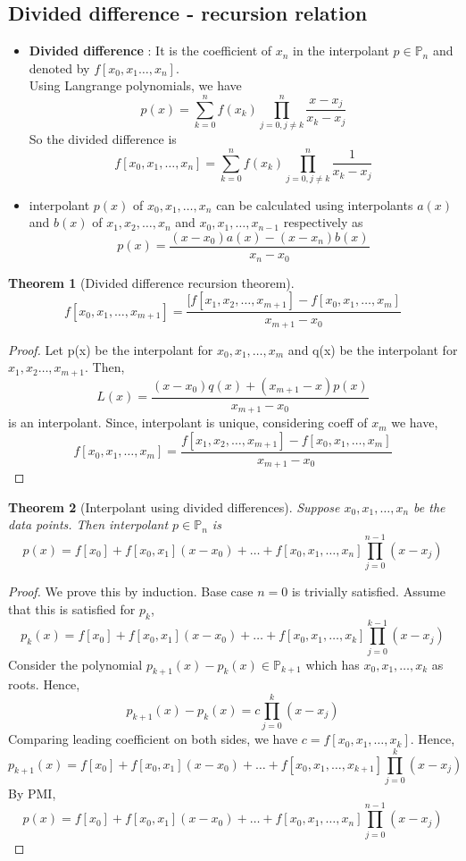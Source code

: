 \documentclass{article}
\newtheorem*{theorem}{Theorem}
\begin{document}
\subsection{Divided difference - recursion relation}
	\begin{itemize}
		\item \textbf{Divided difference} : It is the coefficient of $x_n$ in the interpolant $p \in \mathbb{P}_n$ and denoted by $f[x_0,x_1\hdots,x_n]$.\\
		Using Langrange polynomials, we have
		\[p(x)=\sum_{k=0}^n f(x_k) \prod_{j=0, j\neq k}^n \frac{x-x_j}{x_k-x_j}\]
		So the divided difference is
		\[f[x_0,x_1,\hdots,x_n]=\sum_{k=0}^n f(x_k) \prod_{j=0, j\neq k}^n \frac{1}{x_k-x_j}\]

		\item interpolant $p(x)$ of  $x_0,x_1,\hdots,x_n$ can be calculated using interpolants $a(x)$ and $b(x)$ of $x_1,x_2,\hdots,x_n$ and $x_0,x_1,\hdots,x_{n-1}$ respectively as 
			\[p(x)=\frac{(x-x_0)a(x)-(x-x_n)b(x)}{x_n-x_0}\]
	\end{itemize}

	\begin{theorem}[Divided difference recursion theorem]
		\[f[x_0,x_1,\hdots,x_{m+1}] = \frac{[f[x_1, x_2,\hdots,x_{m+1}] - f[x_0,x_1,\hdots,x_{m}]}{x_{m+1}-x_0}\]
	\end{theorem}
	\begin{proof}
		Let p(x) be the interpolant for $x_0,x_1,\hdots,x_m$ and q(x) be the interpolant for $x_1,x_2\hdots,x_{m+1}$. Then,
		\[L(x)= \frac{(x-x_0)q(x)+(x_{m+1}-x)p(x)}{x_{m+1}-x_0}\] is an interpolant.
		Since, interpolant is unique, considering coeff of $x_{m}$ we have,
		\[f[x_0,x_1,\hdots, x_m]=  \frac{f[x_1, x_2,\hdots,x_{m+1}] - f[x_0,x_1,\hdots,x_{m}]}{x_{m+1}-x_0}\]
	\end{proof}

	\begin{theorem}[Interpolant using divided differences]
		Suppose $x_0,x_1,\hdots,x_n$ be the data points. Then interpolant $p \in \mathbb{P}_n$ is
		\[p(x)=f[x_0]+f[x_0,x_1](x-x_0)+ \hdots +f[x_0,x_1,\hdots,x_n] \prod_{j=0}^{n-1}(x-x_j)\]
	\end{theorem}

	\begin{proof}
		We prove this by induction. Base case $n=0$ is trivially satisfied.
		Assume that this is satisfied for $p_{k}$,
		\[p_k(x)=f[x_0]+f[x_0,x_1](x-x_0)+ \hdots +f[x_0,x_1,\hdots,x_k] \prod_{j=0}^{k-1}(x-x_j)\]
		Consider the polynomial $p_{k+1}(x)-p_k(x) \in \mathbb{P}_{k+1}$ which has $x_0,x_1,\hdots,x_k$ as roots. Hence,
		\[p_{k+1}(x)-p_k(x) = c\prod_{j=0}^k(x-x_j)\]
		Comparing leading coefficient on both sides, we have $c=f[x_0,x_1,\hdots,x_k]$. Hence,
		\[p_{k+1}(x)=f[x_0]+f[x_0,x_1](x-x_0)+ \hdots +f[x_0,x_1,\hdots,x_{k+1}] \prod_{j=0}^{k}(x-x_j)\]
		By PMI,
		\[p(x)=f[x_0]+f[x_0,x_1](x-x_0)+ \hdots +f[x_0,x_1,\hdots,x_n] \prod_{j=0}^{n-1}(x-x_j)\]


	\end{proof}
\end{document}

